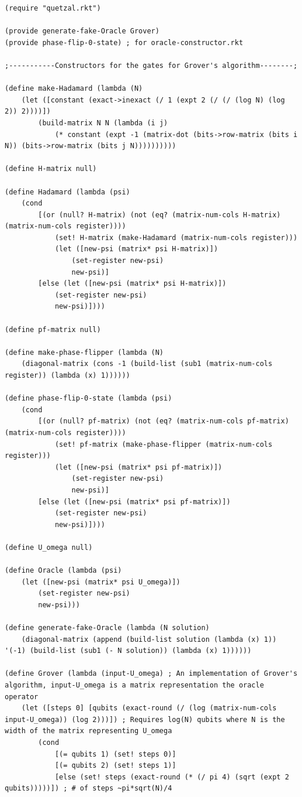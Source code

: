\documentclass[11pt]{article}
\begin{document}
\begin{appendices}
\begin{lstlisting}
(require "quetzal.rkt")

(provide generate-fake-Oracle Grover)
(provide phase-flip-0-state) ; for oracle-constructor.rkt

;-----------Constructors for the gates for Grover's algorithm--------;

(define make-Hadamard (lambda (N)
	(let ([constant (exact->inexact (/ 1 (expt 2 (/ (/ (log N) (log 2)) 2))))])
		(build-matrix N N (lambda (i j)
			(* constant (expt -1 (matrix-dot (bits->row-matrix (bits i N)) (bits->row-matrix (bits j N))))))))))

(define H-matrix null)

(define Hadamard (lambda (psi)
	(cond
		[(or (null? H-matrix) (not (eq? (matrix-num-cols H-matrix) (matrix-num-cols register))))
			(set! H-matrix (make-Hadamard (matrix-num-cols register)))
			(let ([new-psi (matrix* psi H-matrix)])
				(set-register new-psi)
				new-psi)]
		[else (let ([new-psi (matrix* psi H-matrix)])
			(set-register new-psi)
			new-psi)])))

(define pf-matrix null)

(define make-phase-flipper (lambda (N)
	(diagonal-matrix (cons -1 (build-list (sub1 (matrix-num-cols register)) (lambda (x) 1))))))

(define phase-flip-0-state (lambda (psi)
	(cond
		[(or (null? pf-matrix) (not (eq? (matrix-num-cols pf-matrix) (matrix-num-cols register))))
			(set! pf-matrix (make-phase-flipper (matrix-num-cols register)))
			(let ([new-psi (matrix* psi pf-matrix)])
				(set-register new-psi)
				new-psi)]
		[else (let ([new-psi (matrix* psi pf-matrix)])
			(set-register new-psi)
			new-psi)])))

(define U_omega null)

(define Oracle (lambda (psi)
	(let ([new-psi (matrix* psi U_omega)])
		(set-register new-psi)
		new-psi)))

(define generate-fake-Oracle (lambda (N solution)
	(diagonal-matrix (append (build-list solution (lambda (x) 1)) '(-1) (build-list (sub1 (- N solution)) (lambda (x) 1))))))

(define Grover (lambda (input-U_omega) ; An implementation of Grover's algorithm, input-U_omega is a matrix representation the oracle operator
	(let ([steps 0] [qubits (exact-round (/ (log (matrix-num-cols input-U_omega)) (log 2)))]) ; Requires log(N) qubits where N is the width of the matrix representing U_omega
		(cond
			[(= qubits 1) (set! steps 0)]
			[(= qubits 2) (set! steps 1)]
			[else (set! steps (exact-round (* (/ pi 4) (sqrt (expt 2 qubits)))))]) ; # of steps ~pi*sqrt(N)/4


\end{lstlisting}
\end{appendices}
\end{document}
